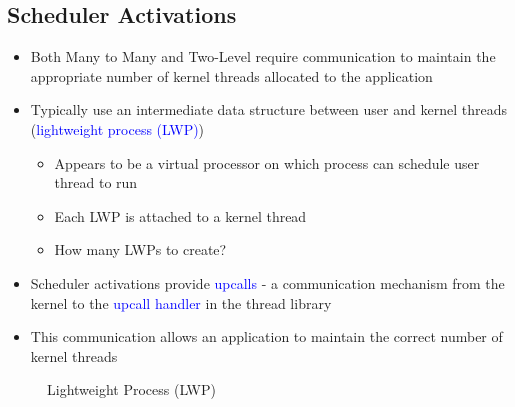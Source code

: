 \documentclass[oneside]{book}
\begin{document}
            \subsection{Scheduler Activations}
                \begin{itemize}
                    \item Both Many to Many and Two-Level require communication to maintain the appropriate 
                    number of kernel threads allocated to the application
                    \item Typically use an intermediate data structure between user and kernel threads (\textcolor{blue}{lightweight process (LWP)})
                        \begin{itemize}
                            \item Appears to be a virtual processor on which process can schedule user thread to run
                            \item Each LWP is attached to a kernel thread
                            \item How many LWPs to create?
                        \end{itemize}
                    \item Scheduler activations provide \textcolor{blue}{upcalls} - a communication mechanism from the kernel
                    to the \textcolor{blue}{upcall handler} in the thread library
                    \item This communication allows an application to maintain the correct number of kernel threads
                \end{itemize}
                \begin{figure}[H]
                    \centering
                    \caption{Lightweight Process (LWP)}
                \end{figure}
\end{document}
